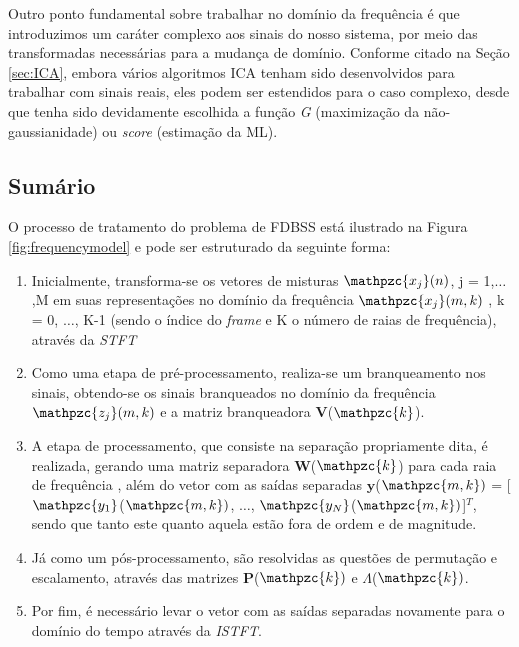         Outro ponto fundamental sobre trabalhar no domínio da frequência é que introduzimos um caráter complexo aos sinais do nosso sistema, por meio das transformadas necessárias para a mudança de domínio. Conforme citado na Seção \ref{sec:ICA}, embora vários algoritmos ICA tenham sido desenvolvidos para trabalhar com sinais reais, eles podem ser estendidos para o caso complexo, desde que tenha sido devidamente escolhida a função \textit{G} (maximização da não-gaussianidade) ou \textit{score} (estimação da ML). 
        
    \subsection{Sumário}
        O processo de tratamento do problema de FDBSS está ilustrado na Figura \ref{fig:frequencymodel} e pode ser estruturado da seguinte forma:
        
        \begin{enumerate}
            \item Inicialmente, transforma-se os vetores de misturas $\mathpzc{x_j}(n)$, j = 1,$\dots$,M em suas representações no domínio da frequência $\mathpzc{x_j}(m,k)$ , k = 0, $\dots$, K-1 (sendo  o índice do \textit{frame} e K o número de raias de frequência), através da \textit{STFT}
            
            \item Como uma etapa de pré-processamento, realiza-se um branqueamento nos sinais, obtendo-se os sinais branqueados no domínio da frequência  $\mathpzc{z_j}(m,k)$ e a matriz branqueadora $\mathbf{V}$($\mathpzc{k}$).
            
            \item A etapa de processamento, que consiste na separação propriamente dita, é realizada, gerando uma matriz separadora $\mathbf{W}$($\mathpzc{k}$) para cada raia de frequência , além do vetor com as saídas separadas $\mathbf{y}$($\mathpzc{m,k})$ = [$\mathpzc{y_1}$($\mathpzc{m,k})$, $\dots$, $\mathpzc{y_N}$($\mathpzc{m,k})$]$^T$, sendo que tanto este quanto aquela estão fora de ordem e de magnitude.
            
            \item Já como um pós-processamento, são resolvidas as questões de permutação e escalamento, através das matrizes $\mathbf{P}$($\mathpzc{k})$ e $\Lambda$($\mathpzc{k})$.
            
            \item Por fim, é necessário levar o vetor com as saídas separadas novamente para o domínio do tempo através da \textit{ISTFT}.
            
        \end{enumerate}

